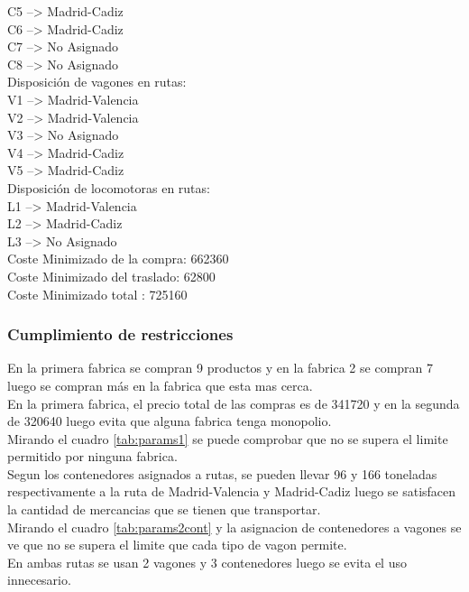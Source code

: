 \documentclass[11pt,spanish]{article}
\begin{document}
\begin{tabbing}
			\>	C5 --> Madrid-Cadiz\\
			\>	C6 --> Madrid-Cadiz\\
			\>	C7 --> No Asignado\\
			\>	C8 --> No Asignado\\
			Disposición de vagones en rutas:\\
			\>	V1 --> Madrid-Valencia\\
			\>	V2 --> Madrid-Valencia\\
			\>	V3 --> No Asignado\\
			\>	V4 --> Madrid-Cadiz\\
			\>	V5 --> Madrid-Cadiz\\
			Disposición de locomotoras en rutas:\\
			\>	L1 --> Madrid-Valencia\\
			\>	L2 --> Madrid-Cadiz\\
			\>	L3 --> No Asignado\\
			Coste Minimizado de la compra: 662360\\
			Coste Minimizado del traslado: 62800\\
			Coste Minimizado total       : 725160\\
			\end{tabbing}
			\subsubsection{Cumplimiento de restricciones}
			En la primera fabrica se compran 9 productos y en la fabrica 2 se compran 7 luego se compran más en la fabrica que esta mas cerca.\\
			En la primera fabrica, el precio total de las compras es de 341720 y en la segunda de 320640 luego evita que alguna fabrica tenga monopolio.\\
			Mirando el cuadro \ref{tab:params1} se puede comprobar que no se supera el limite permitido por ninguna fabrica.\\
			Segun los contenedores asignados a rutas, se pueden llevar 96 y 166 toneladas respectivamente a la ruta de Madrid-Valencia y Madrid-Cadiz luego se satisfacen la cantidad de mercancias que se tienen que transportar.\\
			Mirando el cuadro \ref{tab:params2cont} y la asignacion de contenedores a vagones se ve que no se supera el limite que cada tipo de vagon permite.\\
			En ambas rutas se usan 2 vagones y 3 contenedores luego se evita el uso innecesario.
\end{document}
